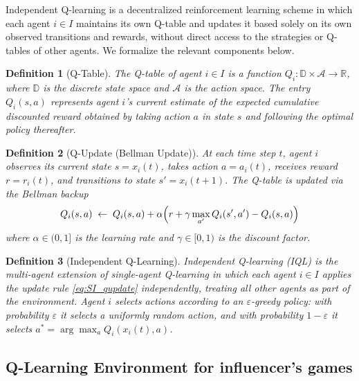 \documentclass{article}
\newtheorem{definition}{Definition}
\begin{document}
            Independent Q-learning is a decentralized reinforcement learning scheme in which each agent $i \in I$ maintains its own Q-table and updates it based solely on its own observed transitions and rewards, without direct access to the strategies or Q-tables of other agents. We formalize the relevant components below.

            \begin{definition}[Q-Table]
                The Q-table of agent $i \in I$ is a function $Q_i : \mathbb{D} \times \mathcal{A} \to \mathbb{R}$, where $\mathbb{D}$ is the discrete state space and $\mathcal{A}$ is the action space. The entry $Q_i(s,a)$ represents agent $i$'s current estimate of the expected cumulative discounted reward obtained by taking action $a$ in state $s$ and following the optimal policy thereafter.
            \end{definition}

            \begin{definition}[Q-Update (Bellman Update)]
                At each time step $t$, agent $i$ observes its current state $s = x_i(t)$, takes action $a = a_i(t)$, receives reward $r = r_i(t)$, and transitions to state $s' = x_i(t+1)$. The Q-table is updated via the Bellman backup
                \begin{equation}\label{eq:SI_qupdate}
                    Q_i(s,a) \;\leftarrow\; Q_i(s,a) + \alpha\Bigl( r + \gamma\max_{a'}Q_i(s',a') - Q_i(s,a)\Bigr)
                \end{equation}
                where $\alpha \in (0,1]$ is the learning rate and $\gamma \in [0,1)$ is the discount factor.
            \end{definition}

            \begin{definition}[Independent Q-Learning]
                Independent Q-learning (IQL) is the multi-agent extension of single-agent Q-learning \cite{watkins1992q,tan1993multi,matignon2012independent} in which each agent $i \in I$ applies the update rule \cref{eq:SI_qupdate} independently, treating all other agents as part of the environment. Agent $i$ selects actions according to an $\varepsilon$-greedy policy: with probability $\varepsilon$ it selects a uniformly random action, and with probability $1 - \varepsilon$ it selects $a^* = \arg\max_{a} Q_i(x_i(t), a)$.
            \end{definition}

        \subsection{Q-Learning Environment for influencer's games}\label{subsec:SI_qenv}
\end{document}
